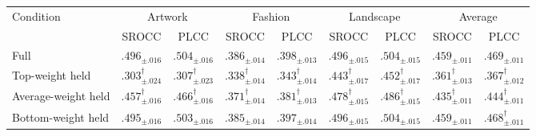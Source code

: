 \begin{tabular}{l cc cc cc cc}
\toprule
\multirow{2}{*}{Condition} & \multicolumn{2}{c}{Artwork} & \multicolumn{2}{c}{Fashion} & \multicolumn{2}{c}{Landscape} & \multicolumn{2}{c}{Average} \\
\cmidrule(lr){2-3}\cmidrule(lr){4-5}\cmidrule(lr){6-7}\cmidrule(lr){8-9}
& SROCC & PLCC & SROCC & PLCC & SROCC & PLCC & SROCC & PLCC \\
\midrule
Full & $\bm{.496_{\pm .016}}$ & $\bm{.504_{\pm .016}}$ & $\bm{.386_{\pm .014}}$ & $\bm{.398_{\pm .013}}$ & $\bm{.496_{\pm .015}}$ & $\bm{.504_{\pm .015}}$ & $\bm{.459_{\pm .011}}$ & $\bm{.469_{\pm .011}}$ \\
Top-weight held & $.303_{\pm .024}^{\dagger}$ & $.307_{\pm .023}^{\dagger}$ & $.338_{\pm .014}^{\dagger}$ & $.343_{\pm .014}^{\dagger}$ & $.443_{\pm .017}^{\dagger}$ & $.452_{\pm .017}^{\dagger}$ & $.361_{\pm .013}^{\dagger}$ & $.367_{\pm .012}^{\dagger}$ \\
Average-weight held & $.457_{\pm .016}^{\dagger}$ & $.466_{\pm .016}^{\dagger}$ & $.371_{\pm .014}^{\dagger}$ & $.381_{\pm .013}^{\dagger}$ & $.478_{\pm .015}^{\dagger}$ & $.486_{\pm .015}^{\dagger}$ & $.435_{\pm .011}^{\dagger}$ & $.444_{\pm .011}^{\dagger}$ \\
Bottom-weight held & $.495_{\pm .016}$ & $.503_{\pm .016}$ & $.385_{\pm .014}$ & $.397_{\pm .014}$ & $.496_{\pm .015}$ & $.504_{\pm .015}$ & $.459_{\pm .011}$ & $.468_{\pm .011}^{\dagger}$ \\
\bottomrule
\end{tabular}
